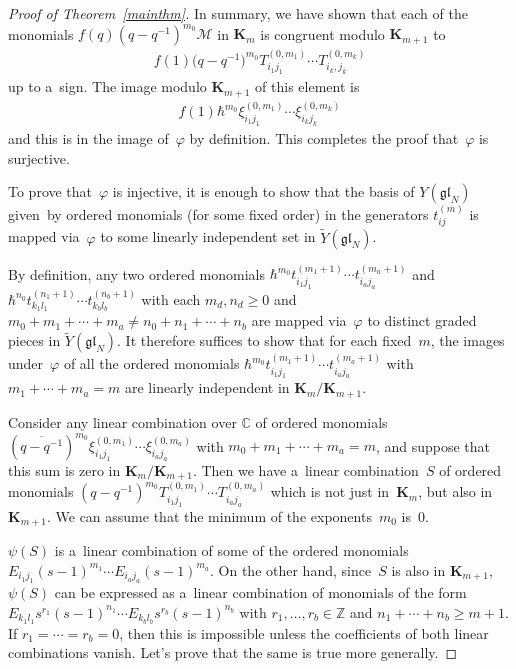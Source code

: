 \documentclass[pdftex]{sigma}
\numberwithin{theorem}{section}
\numberwithin{proposition}{section}
\numberwithin{lemma}{section}
\numberwithin{corollary}{section}
\numberwithin{definition}{section}
\numberwithin{example}{section}
\numberwithin{remark}{section}
\numberwithin{note}{section}
\numberwithin{equation}{section}
\begin{document}
\begin{proof}[Proof of Theorem~\ref{mainthm}]
In summary, we have shown that each of the monomials $f(q)(q-q^{-1})^{m_0}\mathcal{M}$ in $\mathbf{K}_m$ is congruent
modulo $\mathbf{K}_{m+1}$ to
\begin{gather*}
f(1)\big(q-q^{-1}\big)^{m_0} T_{i_1 j_1}^{(0,m_1)} \cdots T_{i_k,j_k}^{(0,m_k)}
\end{gather*}
up to a~sign.
The image modulo $\mathbf{K}_{m+1}$ of this element is
\begin{gather*}
f(1)\hbar^{m_0}\xi_{i_1 j_1}^{(0,m_1)} \cdots \xi_{i_k j_k}^{(0,m_k)}
\end{gather*}
and this is in the image of~$\varphi$ by def\/inition.
This completes the proof that~$\varphi$ is surjective.

To prove that~$\varphi$ is injective, it is enough to show that the basis of $Y(\mathfrak{gl}_N)$ given~by
ordered monomials (for some f\/ixed order) in the generators $t_{ij}^{(m)}$ is mapped via~$\varphi$ to some linearly
independent set in $\widetilde{Y}(\mathfrak{gl}_N)$.

By def\/inition, any two ordered monomials $\hbar^{m_0}t_{i_1 j_1}^{(m_1+1)} \cdots t_{i_a j_a}^{(m_a+1)}$ and
$\hbar^{n_0}t_{k_1 l_1}^{(n_1+1)} \cdots t_{k_b l_b}^{(n_b+1)}$ with each $m_d, n_d \geq 0$ and $m_0+m_1+\cdots+m_a \neq
n_0+n_1 + \cdots + n_b$ are mapped via~$\varphi$ to distinct graded pieces in $\widetilde{Y}(\mathfrak{gl}_N)$.
It therefore suf\/f\/ices to show that for each f\/ixed~$m$, the images under~$\varphi$ of all the ordered monomials
$\hbar^{m_0} t_{i_1 j_1}^{(m_1+1)} \cdots t_{i_a j_a}^{(m_a+1)}$ with $m_1+\cdots+m_a=m$ are linearly independent in
$\mathbf{K}_m/\mathbf{K}_{m+1}$.

Consider any linear combination over $\mathbb{C}$ of ordered monomials $(\overline{q-q^{-1}})^{m_0}\xi_{i_1
j_1}^{(0,m_1)} \cdots \xi_{i_a j_a}^{(0,m_a)}$ with $m_0+m_1+\cdots+m_a=m$, and suppose that this sum is zero in
$\mathbf{K}_m/\mathbf{K}_{m+1}$.
Then we have a~linear combination~$S$ of ordered monomials $(q-q^{-1})^{m_0}T_{i_1 j_1}^{(0,m_1)} \cdots T_{i_a
j_a}^{(0,m_a)}$ which is not just in~$\mathbf{K}_m$, but also in~$\mathbf{K}_{m+1}$.
We can assume that the minimum of the exponents~$m_0$ is~$0$.

$\psi(S)$ is a~linear combination of some of the ordered monomials $E_{i_1 j_1}(s-1)^{m_1} \cdots E_{i_a j_a}
(s-1)^{m_a}$.
On the other hand, since~$S$ is also in $\mathbf{K}_{m+1}$, $\psi(S)$ can be expressed as a~linear combination of
monomials of the form $E_{k_1 l_1} s^{r_1} (s-1)^{n_1} \cdots E_{k_b l_b} s^{r_b} (s-1)^{n_b}$ with $r_1,\ldots,r_b \in
\mathbb{Z}$ and $n_1+\cdots+n_b \geq m+1$.
If $r_1 = \cdots = r_b=0$, then this is impossible unless the coef\/f\/icients of both linear combinations vanish.
Let's prove that the same is true more generally.


\end{proof}
\end{document}
